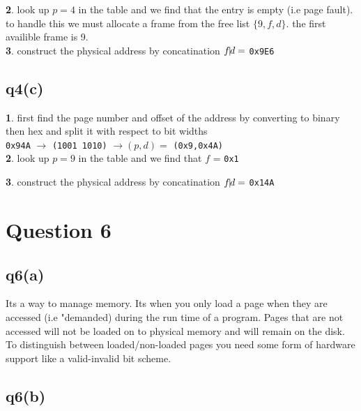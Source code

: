 \documentclass{assignment}
\def\code#1{\texttt{#1}}
\begin{document}
\textbf{2}. look up $p=4$ in the table and we find that the entry is empty (i.e page fault). to handle this we must allocate a frame from the free list $\{9,f,d\}$. the first availible frame is 9. \\

\textbf{3}. construct the physical address by concatination $f \vline d =$ \code{0x9E6}  \\ 


\subsection*{q4(c)}
\textbf{1}. first find the page number and offset of the address by converting to binary then hex and split it with respect to bit widths \\
\code{0x94A} $ \rightarrow$  \code{(1001  1010)} $\rightarrow (p,d) =$ \code{(0x9,0x4A)} \\

\textbf{2}. look up $p=9$ in the table and we find that $f$ = \code{0x1}  

\textbf{3}. construct the physical address by concatination $f \vline d =$ \code{0x14A}  \\ 




\section*{Question 6}
\subsection*{q6(a)}
Its a way to manage memory. Its when you only load a page when they are accessed (i.e "demanded) during the run time of a program.
Pages that are not accessed will not be loaded on to physical memory and will remain on the disk. To distinguish between
loaded/non-loaded pages you need some form of hardware support like a valid-invalid bit scheme.

\subsection*{q6(b)}
\end{document}
